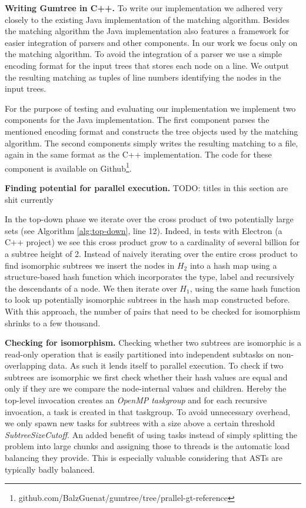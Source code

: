 \documentclass[letterpaper]{article}
\newcommand{\mypar}[1]{{\bf #1.}}
\begin{document}
\mypar{Writing Gumtree in C++}
To write our implementation we adhered very closely to the existing Java implementation of the matching algorithm.
Besides the matching algorithm the Java implementation also features a framework for easier integration of parsers and other components.
In our work we focus only on the matching algorithm.
To avoid the integration of a parser we use a simple encoding format for the input trees that stores each node on a line.
We output the resulting matching as tuples of line numbers identifying the nodes in the input trees.

For the purpose of testing and evaluating our implementation we implement two components for the Java implementation.
The first component parses the mentioned encoding format and constructs the tree objects used by the matching algorithm.
The second components simply writes the resulting matching to a file, again in the same format as the C++ implementation.
The code for these component is available on Github\footnote{github.com/BalzGuenat/gumtree/tree/prallel-gt-reference}.

\mypar{Finding potential for parallel execution}
TODO: titles in this section are shit currently

In the top-down phase we iterate over the cross product of two potentially large sets (see Algorithm \ref{alg:top-down}, line 12).
Indeed, in tests with Electron (a C++ project) we see this cross product grow to a cardinality of several billion for a subtree height of 2.
Instead of naively iterating over the entire cross product to find isomorphic subtrees we insert the nodes in $H_2$ into a hash map using a structure-based hash function which incorporates the type, label and recursively the descendants of a node.
We then iterate over $H_1$, using the same hash function to look up potentially isomorphic subtrees in the hash map constructed before.
With this approach, the number of pairs that need to be checked for isomorphism shrinks to a few thousand.

\mypar{Checking for isomorphism}
Checking whether two subtrees are isomorphic is a read-only operation that is easily partitioned into independent subtasks on non-overlapping data.
As such it lends itself to parallel execution.
To check if two subtrees are isomorphic we first check whether their hash values are equal and only if they are we compare the node-internal values and children.
Hereby the top-level invocation creates an \emph{OpenMP taskgroup} and for each recursive invocation, a task is created in that taskgroup.
To avoid unnecessary overhead, we only spawn new tasks for subtrees with a size above a certain threshold \emph{SubtreeSizeCutoff}.
An added benefit of using tasks instead of simply splitting the problem into large chunks and assigning those to threads is the automatic load balancing they provide.
This is especially valuable considering that ASTs are typically badly balanced.
\end{document}
